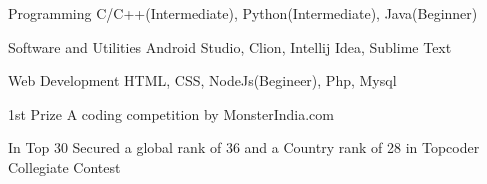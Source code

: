 \documentclass[11pt, a4paper]{awesome-cv}
\begin{document}
\begin{cvskills}

  \cvskill
    {Programming} %
    {C/C++(Intermediate), Python(Intermediate), Java(Beginner)} %

  \cvskill
    {Software and Utilities} %
    {Android Studio, Clion, Intellij Idea, Sublime Text} %

  \cvskill
    {Web Development} %
    {HTML, CSS, NodeJs(Begineer), Php, Mysql} %

\end{cvskills}





\begin{cvhonors}

  \cvhonor
    {1st Prize} %
    {A coding competition by MonsterIndia.com} %
    {} %
    {} %
\end{cvhonors}




\begin{cvhonors}

  \cvhonor
    {In Top 30} %
    {Secured a global rank of 36 and a Country rank of 28 in Topcoder Collegiate Contest} %
    {} %
    {} %
   \end{cvhonors}
 
\end{document}
